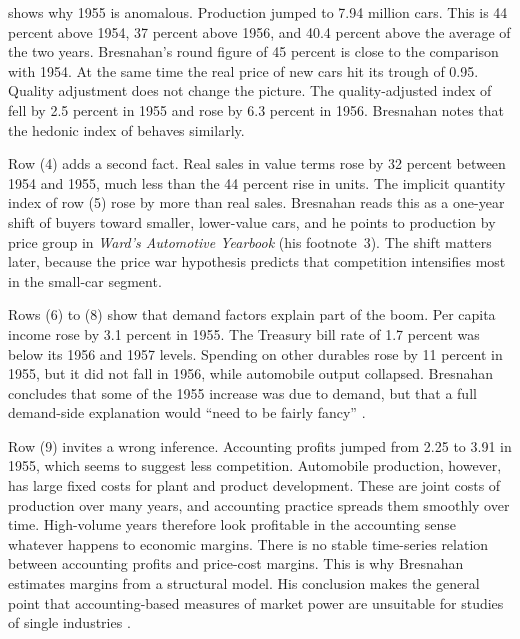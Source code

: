  shows why 1955 is anomalous. Production jumped to 7.94 million cars. This is 44 percent
above 1954, 37 percent above 1956, and 40.4 percent above the average of the two years. Bresnahan's round figure of
45 percent is close to the comparison with 1954. At the same time the real
price of new cars hit its trough of 0.95. Quality adjustment does not change the picture. The quality-adjusted index
of \citet{Cagan1971} fell by 2.5 percent in 1955 and rose by 6.3 percent in 1956. Bresnahan notes that the hedonic
index of \citet{Griliches1964} behaves similarly.

Row (4) adds a second fact. Real sales in value terms rose by 32 percent between 1954 and 1955, much less than the
44 percent rise in units. The implicit quantity index of row (5) rose by more than real sales. Bresnahan reads this
as a one-year shift of buyers toward smaller, lower-value cars, and he points to production by price group in
\emph{Ward's Automotive Yearbook} (his footnote~3). The shift matters later, because the price war hypothesis
predicts that competition intensifies most in the small-car segment.

Rows (6) to (8) show that demand factors explain part of the boom. Per capita income rose by 3.1 percent in 1955.
The Treasury bill rate of 1.7 percent was below its 1956 and 1957 levels. Spending on other durables rose by 11
percent in 1955, but it did not fall in 1956, while automobile output collapsed. Bresnahan concludes that some of
the 1955 increase was due to demand, but that a full demand-side explanation would ``need to be fairly fancy''
\citep[p.~460]{Bresnahan1987}.

Row (9) invites a wrong inference. Accounting profits jumped from 2.25 to 3.91 in 1955, which seems to suggest
less competition. Automobile production, however, has large fixed costs for plant and product development. These
are joint costs of production over many years, and accounting practice spreads them smoothly over time. High-volume
years therefore look profitable in the accounting sense whatever happens to economic margins. There is no stable
time-series relation between accounting profits and price-cost margins. This is why Bresnahan estimates margins
from a structural model. His conclusion makes the general point that accounting-based measures of market power are
unsuitable for studies of single industries \citep[p.~479]{Bresnahan1987}.

